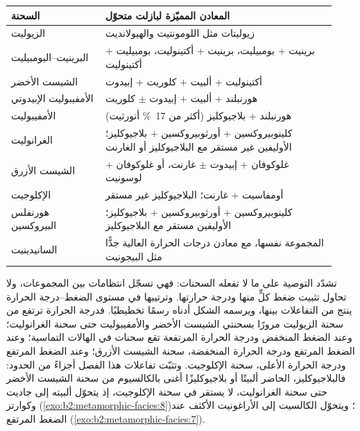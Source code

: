 \begin{center}
\small
\begin{tabular}{@{}p{0.27\linewidth}p{0.66\linewidth}@{}}
\hline
السحنة & المعادن المميّزة لبازلت متحوّل\\
\hline
الزيوليت & زيوليتات مثل اللومونتيت والهيولانديت\\
البرينيت--البومبيليت & برينيت + بومبيليت، برينيت + أكتينوليت، بومبيليت + أكتينوليت\\
الشيست الأخضر & أكتينوليت + ألبيت + كلوريت + إبيدوت\\
الأمفيبوليت الإبيدوتي & هورنبلند + ألبيت + إبيدوت $\pm$ كلوريت\\
الأمفيبوليت & هورنبلند + بلاجيوكليز (أكثر من \qty{17}{\percent} أنورثيت)\\
الغرانوليت & كلينوبيروكسين + أورثوبيروكسين + بلاجيوكليز؛ الأوليفين غير مستقر مع البلاجيوكليز أو الغارنت\\
الشيست الأزرق & غلوكوفان + إبيدوت $\pm$ غارنت، أو غلوكوفان + لوسونيت\\
الإكلوجيت & أومفاسيت + غارنت؛ البلاجيوكليز غير مستقر\\
هورنفلس البيروكسين & كلينوبيروكسين + أورثوبيروكسين + بلاجيوكليز؛ الأوليفين مستقر مع البلاجيوكليز\\
السانيدينيت & المجموعة نفسها، مع معادن درجات الحرارة العالية جدًّا مثل البيجونيت\\
\hline
\end{tabular}
\par{}
\end{center}

تشدّد التوصية على ما لا تفعله السحنات: فهي تسجّل انتظامات بين
المجموعات، ولا تحاول تثبيت ضغط كلٍّ منها ودرجة حرارتها. وترتيبها في
مستوى الضغط--درجة الحرارة ينتج من التفاعلات بينها، ويرسمه
الشكل أدناه رسمًا تخطيطيًا. فدرجة الحرارة ترتفع من سحنة الزيوليت مرورًا
بسحنتي الشيست الأخضر والأمفيبوليت حتى سحنة الغرانوليت؛ وعند الضغط المنخفض ودرجة
الحرارة المرتفعة تقع سحنات  في الهالات التماسية؛ وعند الضغط المرتفع ودرجة الحرارة
المنخفضة، سحنة الشيست الأزرق؛ وعند الضغط المرتفع ودرجة الحرارة الأعلى، سحنة
الإكلوجيت. وتثبّت تفاعلات هذا الفصل أجزاءً من الحدود: فالبلاجيوكليز،
الحاضر ألبيتًا أو بلاجيوكليزًا أغنى بالكالسيوم من سحنة الشيست الأخضر حتى سحنة الغرانوليت،
لا يستقر في سحنة الإكلوجيت، إذ
يتحوّل ألبيته إلى جاديت وكوارتز (\cref{exo:b2:metamorphic-facies:8})؛ ويتحوّل الكالسيت إلى
الأراغونيت الأكثف عند الضغط المرتفع (\cref{exo:b2:metamorphic-facies:7}).

